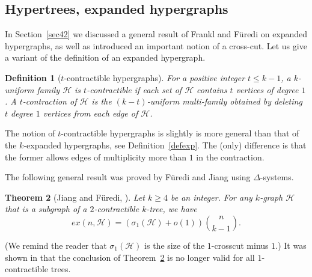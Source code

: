 \documentclass[graybox]{svmult}
\renewcommand{\le}{\leqslant}
\renewcommand{\ge}{\geqslant}
\newcommand{\m}{\mathcal}
\newtheorem{thm}{Theorem}
\newtheorem{defn}[thm]{Definition}
\begin{document}
\subsection{Hypertrees, expanded hypergraphs} In Section~\ref{sec42} we discussed a general result of Frankl and F\"uredi on expanded hypergraphs, as well as introduced an important notion of a cross-cut. Let us give a variant of the definition of an expanded hypergraph.






\begin{defn}[$t$-contractible hypergraphs]\label{defcont} For a positive integer $t \le k-1$,  a $k$-uniform family $\m H$ is {\em $t$-contractible} if each set of $\m H$ contains $t$ vertices of degree $1$. A $t$-contraction of $\m H$ is the $(k-t)$-uniform multi-family obtained by deleting $t$ degree $1$ vertices from each edge of $\m H$.
\end{defn}
The notion of $t$-contractible hypergraphs is slightly is more general than that of the $k$-expanded hypergraphs, see Definition~\ref{defexp}. The (only) difference is that the former allows edges of multiplicity more than $1$ in the contraction.


The following general result was proved by F\"uredi and Jiang \cite{FJ15} using $\Delta$-systems.
\begin{thm}[Jiang and F\"uredi, \cite{FJ15}]\label{thmjf}
  Let $k\ge 4$ be an integer. For any $k$-graph $\m H$ that is a subgraph of a $2$-contractible $k$-tree, we have
  $$ex(n,\m H) = (\sigma_1(\m H)+o(1)){n\choose k-1}.$$
\end{thm}
(We remind the reader that $\sigma_1(\m H)$ is the size of the $1$-crosscut minus $1$.) It was shown in \cite{FJ15}  that the conclusion of Theorem~\ref{thmjf} is no longer valid for all $1$-contractible trees.
\end{document}
